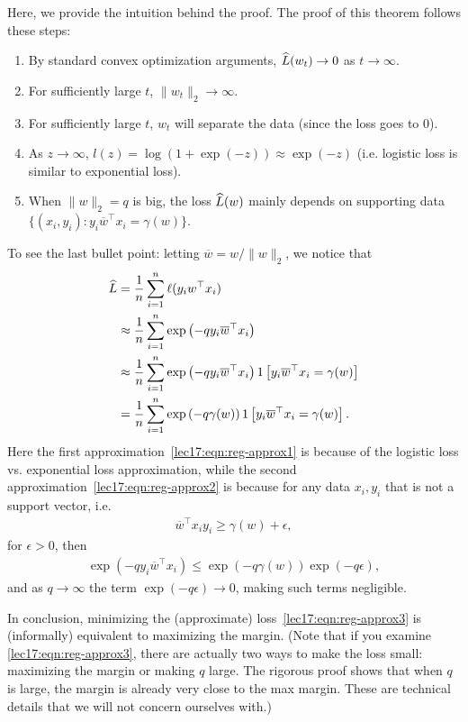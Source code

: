 Here, we provide the intuition behind the proof. The proof of this theorem follows these steps:
\begin{enumerate}
	\item By standard convex optimization arguments, $\widehat{L} (w_t) \rightarrow 0$ as $t\rightarrow \infty$.
	\item For sufficiently large $t$, $\|w_t\|_2 \rightarrow \infty$.
	\item For sufficiently large $t$, $w_t$ will separate the data (since the loss goes to 0).
	\item As $z \rightarrow \infty$, $l(z) = \log(1 + \exp (-z)) \approx \exp(-z)$ (i.e. logistic loss is similar to exponential loss). 
	\item When $\|w\|_2 = q $ is big, the loss $\widehat{L}(w)$ mainly depends on supporting data $\{(x_i, y_i) : y_i\overline{w}^\top x_i = \gamma(w)\}$.
\end{enumerate}

To see the last bullet point: letting $\overline{w} = w / \|w\|_2$, we notice that 
\begin{align}
	\widehat{L} &= \frac{1}{n} \sum_{i=1}^{n} \ell(y_i w^\top x_i)\\
	&\approx \frac{1}{n} \sum_{i=1}^{n} \exp\left(-qy_i \overline{w}^\top x_i\right) \label{lec17:eqn:reg-approx1} \\
	&\approx \frac{1}{n} \sum_{i=1}^{n} \exp\left(-qy_i \overline{w}^\top x_i\right) 1\left[y_i \overline{w}^\top x_i = \gamma(w)\right] \label{lec17:eqn:reg-approx2} \\
	&= \frac{1}{n} \sum_{i=1}^{n} \exp\left(-q\gamma(w) \right) 1\left[y_i \overline{w}^\top x_i = \gamma(w)\right]. \label{lec17:eqn:reg-approx3}
\end{align}
Here the first approximation~\eqref{lec17:eqn:reg-approx1} is because of the logistic loss vs. exponential loss approximation, while the second approximation~\eqref{lec17:eqn:reg-approx2} is because for any data $x_i, y_i$ that is not a support vector, i.e.
\begin{align}
	\overline{w}^\top x_i y_i \ge \gamma(w)+\epsilon,
\end{align}
for $\epsilon>0$, then
\begin{align}
	\exp(-qy_i\overline{w}^\top x_i) \le \exp(-q\gamma(w))\exp(-q\epsilon),
\end{align}
and as $q\rightarrow \infty$ the term $\exp(-q\epsilon)\rightarrow 0$, making such terms negligible.

In conclusion, minimizing the (approximate) loss~\eqref{lec17:eqn:reg-approx3} is (informally) equivalent to maximizing the margin. (Note that if you examine \eqref{lec17:eqn:reg-approx3}, there are actually two ways to make the loss small: maximizing the margin or making $q$ large. The rigorous proof shows that when $q$ is large, the margin is already very close to the max margin. These are technical details that we will not concern ourselves with.)


